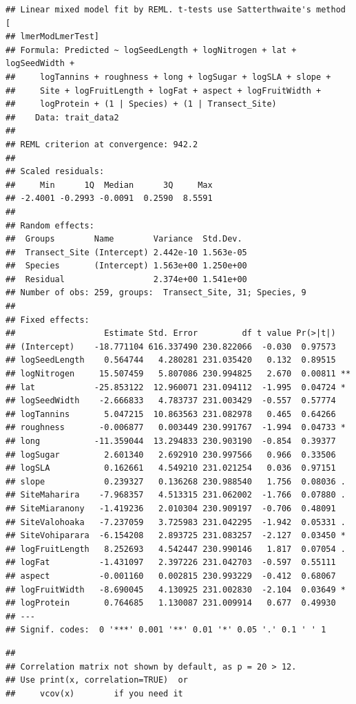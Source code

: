 \documentclass[
  12pt,
]{article}
\begin{document}
\begin{verbatim}
## Linear mixed model fit by REML. t-tests use Satterthwaite's method [
## lmerModLmerTest]
## Formula: Predicted ~ logSeedLength + logNitrogen + lat + logSeedWidth +  
##     logTannins + roughness + long + logSugar + logSLA + slope +  
##     Site + logFruitLength + logFat + aspect + logFruitWidth +  
##     logProtein + (1 | Species) + (1 | Transect_Site)
##    Data: trait_data2
## 
## REML criterion at convergence: 942.2
## 
## Scaled residuals: 
##     Min      1Q  Median      3Q     Max 
## -2.4001 -0.2993 -0.0091  0.2590  8.5591 
## 
## Random effects:
##  Groups        Name        Variance  Std.Dev. 
##  Transect_Site (Intercept) 2.442e-10 1.563e-05
##  Species       (Intercept) 1.563e+00 1.250e+00
##  Residual                  2.374e+00 1.541e+00
## Number of obs: 259, groups:  Transect_Site, 31; Species, 9
## 
## Fixed effects:
##                  Estimate Std. Error         df t value Pr(>|t|)   
## (Intercept)    -18.771104 616.337490 230.822066  -0.030  0.97573   
## logSeedLength    0.564744   4.280281 231.035420   0.132  0.89515   
## logNitrogen     15.507459   5.807086 230.994825   2.670  0.00811 **
## lat            -25.853122  12.960071 231.094112  -1.995  0.04724 * 
## logSeedWidth    -2.666833   4.783737 231.003429  -0.557  0.57774   
## logTannins       5.047215  10.863563 231.082978   0.465  0.64266   
## roughness       -0.006877   0.003449 230.991767  -1.994  0.04733 * 
## long           -11.359044  13.294833 230.903190  -0.854  0.39377   
## logSugar         2.601340   2.692910 230.997566   0.966  0.33506   
## logSLA           0.162661   4.549210 231.021254   0.036  0.97151   
## slope            0.239327   0.136268 230.988540   1.756  0.08036 . 
## SiteMaharira    -7.968357   4.513315 231.062002  -1.766  0.07880 . 
## SiteMiaranony   -1.419236   2.010304 230.909197  -0.706  0.48091   
## SiteValohoaka   -7.237059   3.725983 231.042295  -1.942  0.05331 . 
## SiteVohiparara  -6.154208   2.893725 231.083257  -2.127  0.03450 * 
## logFruitLength   8.252693   4.542447 230.990146   1.817  0.07054 . 
## logFat          -1.431097   2.397226 231.042703  -0.597  0.55111   
## aspect          -0.001160   0.002815 230.993229  -0.412  0.68067   
## logFruitWidth   -8.690045   4.130925 231.002830  -2.104  0.03649 * 
## logProtein       0.764685   1.130087 231.009914   0.677  0.49930   
## ---
## Signif. codes:  0 '***' 0.001 '**' 0.01 '*' 0.05 '.' 0.1 ' ' 1
\end{verbatim}

\begin{verbatim}
## 
## Correlation matrix not shown by default, as p = 20 > 12.
## Use print(x, correlation=TRUE)  or
##     vcov(x)        if you need it
\end{verbatim}
\end{document}
